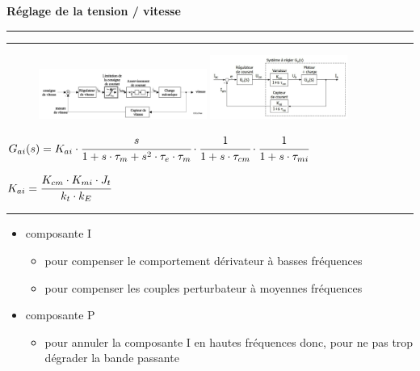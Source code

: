 \documentclass[	DIV=calc,%
							paper=a4,%
							fontsize=10pt,%
							twocolumn]{scrartcl} %
\newcommand{\hformbar}[1]{\bigskip\hrule\vspace{5pt}} %
\newcounter{mycounter}
\newcommand{\formdesc}[1]{\noindent\textbf{#1} \addtocounter{mycounter}{1} \hfill \themycounter}
\newcommand{\formtitle}[1]{\noindent\underline{#1}}
\begin{document}
\formdesc{Réglage de la tension / vitesse}

\hformbar

\formdesc{Anti-windup}


\hformbar


\formdesc{Réglage du courant / couple}
\begin{figure}[H]
    \begin{center}
        \includegraphics[width = 0.49\textwidth]{img/Regulation_courrant.JPG}

        \includegraphics[width = 0.4\textwidth]{img/Regulation_courrant_Gai.JPG}

    \end{center}
\end{figure}

{\footnotesize $G_{ai}(s) = K_{ai} \cdot \cfrac{s}{1+s \cdot \tau_m + s^2 \cdot \tau_e \cdot \tau_m} \cdot \cfrac{1}{1+s \cdot \tau_{cm}}\cdot \cfrac{1}{1+s \cdot \tau_{mi}} $}

\vspace{3mm}

{\footnotesize$K_{ai} = \cfrac{K_{cm} \cdot K_{mi} \cdot J_t}{k_t \cdot k_E}$}

\hformbar

\formtitle{Régulateur PI}
\begin{itemize}
    \item composante I    
        \begin{itemize}
            \item pour compenser le comportement dérivateur à basses fréquences
            \item pour compenser les couples perturbateur à moyennes fréquences
        \end{itemize}
    \item composante P  
    \begin{itemize}
        \item pour annuler la composante I en hautes fréquences donc, pour ne pas trop dégrader la bande passante
    \end{itemize}
\end{itemize}
\end{document}
